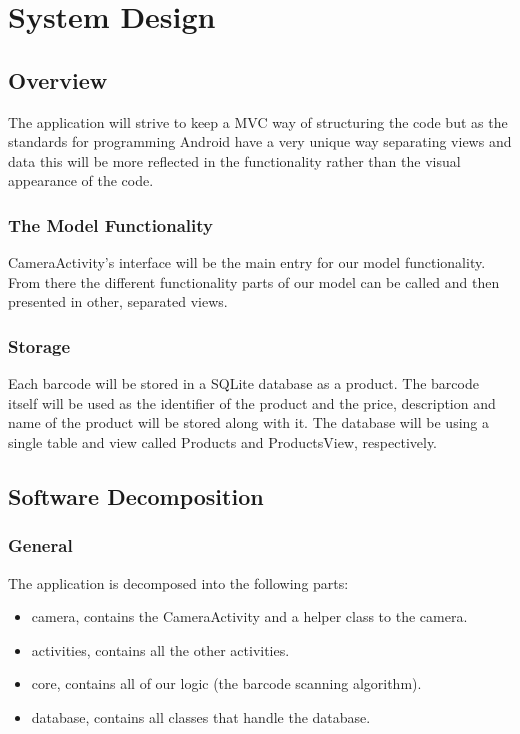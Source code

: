 \documentclass{report}
\begin{document}
\chapter{System Design}

\section{Overview}
The application will strive to keep a MVC way of structuring the code but as the standards for programming Android have a very unique way separating views and data this will be more reflected in the functionality rather than the visual appearance of the code.

\subsection{The Model Functionality}
CameraActivity's interface will be the main entry for our model functionality. From there the different functionality parts of our model can be called and then presented in other, separated views.

\subsection{Storage}
Each barcode will be stored in a SQLite database as a product. The barcode itself will be used as the identifier of the product and the price, description and name of the product will be stored along with it. The database will be using a single table and view called Products and ProductsView, respectively.

\pagebreak

\section{Software Decomposition}

\subsection{General}

The application is decomposed into the following parts:

\begin{itemize}
  \item{camera}, contains the CameraActivity and a helper class to the camera.
  \item{activities}, contains all the other activities.
  \item{core}, contains all of our logic (the barcode scanning algorithm).
  \item{database}, contains all classes that handle the database.
\end{itemize}
\end{document}
